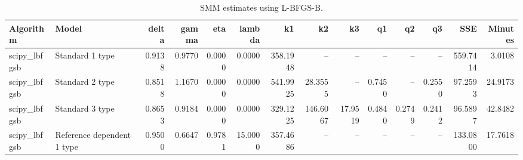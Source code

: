 \begin{table}
\caption{SMM estimates using L-BFGS-B.}
\label{tab:lbfgsb_estimates}
\begin{tabular}{llrrrrrrrrrrrr}
\toprule
Algorithm & Model & delta & gamma & eta & lambda & k1 & k2 & k3 & q1 & q2 & q3 & SSE & Minutes \\
\midrule
scipy_lbfgsb & Standard 1 type & 0.9138 & 0.9770 & 0.0000 & 0.0000 & 358.1948 & -- & -- & -- & -- & -- & 559.7414 & 3.0108 \\
scipy_lbfgsb & Standard 2 type & 0.8518 & 1.1670 & 0.0000 & 0.0000 & 541.9925 & 28.3555 & -- & 0.7450 & -- & 0.2550 & 97.2593 & 24.9173 \\
scipy_lbfgsb & Standard 3 type & 0.8653 & 0.9184 & 0.0000 & 0.0000 & 329.1225 & 146.6067 & 17.9519 & 0.4840 & 0.2749 & 0.2412 & 96.5897 & 42.8482 \\
scipy_lbfgsb & Reference dependent 1 type & 0.9500 & 0.6647 & 0.9781 & 15.0000 & 357.4686 & -- & -- & -- & -- & -- & 133.0800 & 17.7618 \\
\bottomrule
\end{tabular}
\end{table}
